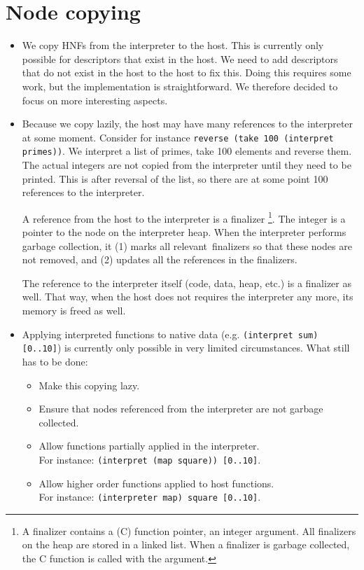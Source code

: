 \documentclass[a4paper]{article}
\begin{document}
\section*{Node copying}
\begin{itemize}
	\item
		We copy HNFs from the interpreter to the host.
		This is currently only possible for descriptors that exist in the host.
		We need to add descriptors that do not exist in the host to the host to fix this.
		Doing this requires some work, but the implementation is straightforward.
		We therefore decided to focus on more interesting aspects.

	\item
		Because we copy lazily, the host may have many references to the interpreter at some moment.
		Consider for instance \texttt{reverse (take 100 (interpret primes))}.
		We interpret a list of primes, take 100 elements and reverse them.
		The actual integers are not copied from the interpreter until they need to be printed.
		This is after reversal of the list, so there are at some point 100 references to the interpreter.

		A reference from the host to the interpreter is a finalizer%
			\footnote{A finalizer contains a (C) function pointer, an integer argument.
				All finalizers on the heap are stored in a linked list.
				When a finalizer is garbage collected, the C function is called with the argument.}.
		The integer is a pointer to the node on the interpreter heap.
		When the interpreter performs garbage collection, it
			(1) marks all relevant\footnotemark\ finalizers so that these nodes are not removed, and
			(2) updates all the references in the finalizers.

		The reference to the interpreter itself (code, data, heap, etc.) is a finalizer as well.
		That way, when the host does not requires the interpreter any more, its memory is freed as well.

	\item
		Applying interpreted functions to native data (e.g. \texttt{(interpret sum) [0..10]}) is currently only possible in very limited circumstances.
		What still has to be done:

		\begin{itemize}
			\item
				Make this copying lazy.
			\item
				Ensure that nodes referenced from the interpreter are not garbage collected.
			\item
				Allow functions partially applied in the interpreter.\\
				For instance: \texttt{(interpret (map square)) [0..10]}.
			\item
				Allow higher order functions applied to host functions.\\
				For instance: \texttt{(interpreter map) square [0..10]}.
		\end{itemize}
\end{itemize}
\end{document}
